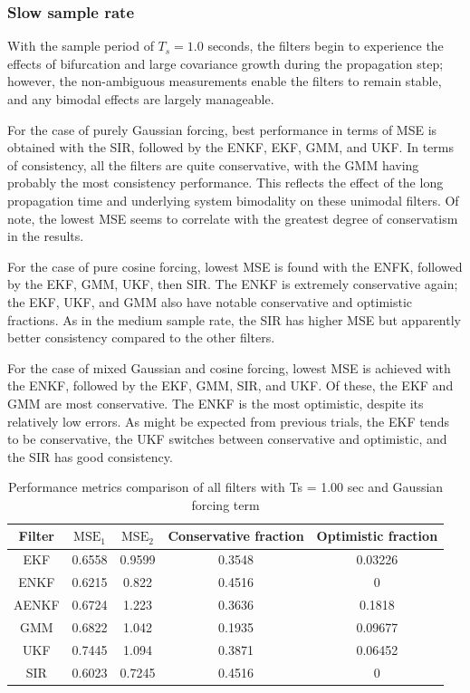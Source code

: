 \documentclass[]{article}
\begin{document}
\subsubsection{Slow sample rate}

With the sample period of $T_s = 1.0$ seconds, the filters begin to experience the effects of bifurcation and large covariance growth during the propagation step; however, the non-ambiguous measurements enable the filters to remain stable, and any bimodal effects are largely manageable. 

For the case of purely Gaussian forcing, best performance in terms of MSE is obtained with the SIR, followed by the ENKF, EKF, GMM, and UKF.  In terms of consistency, all the filters are quite conservative, with the GMM having probably the most consistency performance. This reflects the effect of the long propagation time and underlying system bimodality on these unimodal filters. Of note, the lowest MSE seems to correlate with the greatest degree of conservatism in the results.

For the case of pure cosine forcing, lowest MSE is found with the ENFK, followed by the EKF, GMM, UKF, then SIR. The ENKF is extremely conservative again; the EKF, UKF, and GMM also have notable conservative and optimistic fractions. As in the medium sample rate, the SIR has higher MSE but apparently better consistency compared to the other filters.

For the case of mixed Gaussian and cosine forcing, lowest MSE is achieved with the ENKF, followed by the EKF, GMM, SIR, and UKF. Of these, the EKF and GMM are most conservative. The ENKF is the most optimistic, despite its relatively low errors. As might be expected from previous trials, the EKF tends to be conservative, the UKF switches between conservative and optimistic, and the SIR has good consistency.

\begin{table}[h!]
\centering
\begin{tabular}{|c|c|c|c|c|}
\hline
Filter & $\mathrm{MSE}_1$ & $\mathrm{MSE}_2$ & Conservative fraction & Optimistic fraction \\
\hline
EKF &   0.6558 &   0.9599 &   0.3548 &  0.03226 \\
\hline
ENKF &   0.6215 &    0.822 &   0.4516 &        0 \\
\hline
AENKF &   0.6724 &    1.223 &   0.3636 &   0.1818 \\
\hline
GMM &   0.6822 &    1.042 &   0.1935 &  0.09677 \\
\hline
UKF &   0.7445 &    1.094 &   0.3871 &  0.06452 \\
\hline
SIR &   0.6023 &   0.7245 &   0.4516 &        0 \\
\hline
\end{tabular}
\caption{Performance metrics comparison of all filters with Ts = 1.00 sec and Gaussian forcing term}
\label{table:compare_case_1_sample_2}
\end{table}
\end{document}
